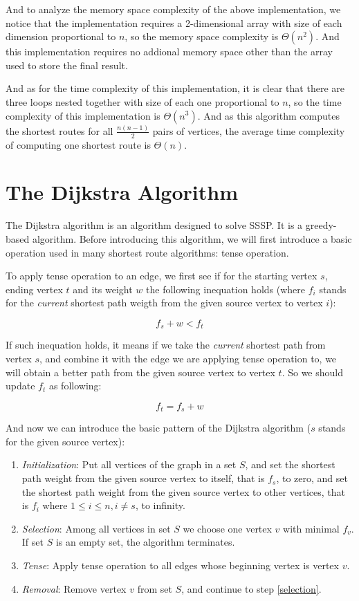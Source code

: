 \documentclass[a4paper,11pt,twocolumn]{article}
\begin{document}
And to analyze the memory space complexity of the above implementation, we notice that the implementation requires a 2-dimensional array with size of each dimension proportional to $n$, so the memory space complexity is $\Theta(n^2)$. And this implementation requires no addional memory space other than the array used to store the final result.

And as for the time complexity of this implementation, it is clear that there are three loops nested together with size of each one proportional to $n$, so the time complexity of this implementation is $\Theta(n^3)$. And as this algorithm computes the shortest routes for all $\frac{n(n-1)}{2}$ pairs of vertices, the average time complexity of computing one shortest route is $\Theta(n)$.

\section{The Dijkstra Algorithm}

The Dijkstra algorithm is an algorithm designed to solve SSSP. It is a greedy-based algorithm. Before introducing this algorithm, we will first introduce a basic operation used in many shortest route algorithms: tense operation.

To apply tense operation to an edge, we first see if for the starting vertex $s$, ending vertex $t$ and its weight $w$ the following inequation holds (where $f_i$ stands for the \emph{current} shortest path weigth from the given source vertex to vertex $i$):

$$f_s+w<f_t$$

If such inequation holds, it means if we take the \emph{current} shortest path from vertex $s$, and combine it with the edge we are applying tense operation to, we will obtain a better path from the given source vertex to vertex $t$. So we should update $f_t$ as following:

$$f_t=f_s+w$$

And now we can introduce the basic pattern of the Dijkstra algorithm ($s$ stands for the given source vertex):

\begin{enumerate}

\item{\emph{Initialization}: Put all vertices of the graph in a set $S$, and set the shortest path weight from the given source vertex to itself, that is $f_s$, to zero, and set the shortest path weight from the given source vertex to other vertices, that is $f_i$ where $1\le i \le n,i\ne s$, to infinity. }

\item{\label{selection}\emph{Selection}: Among all vertices in set $S$ we choose one vertex $v$ with minimal $f_v$. If set $S$ is an empty set, the algorithm terminates. }

\item{\emph{Tense}: Apply tense operation to all edges whose beginning vertex is vertex $v$. }

\item{\emph{Removal}: Remove vertex $v$ from set $S$, and continue to step \ref{selection}. }

\end{enumerate}
\end{document}
